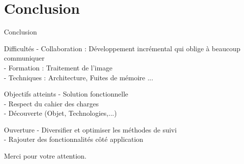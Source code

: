 \documentclass{beamer}
\begin{document}
	\section{Conclusion}
		\begin{frame}{Conclusion}
			\begin{alertblock}{Difficultés}
				- Collaboration : Développement incrémental qui oblige à beaucoup communiquer \\
				- Formation : Traitement de l'image \\
				- Techniques : Architecture, Fuites de mémoire ...\\
			\end{alertblock}
			\pause
			\begin{exampleblock}{Objectifs atteints}
				- Solution fonctionnelle \\
				- Respect du cahier des charges \\
				- Découverte (Objet, Technologies,...) \\ 
			\end{exampleblock}
			\pause
			\begin{block}{Ouverture}
				- Diversifier et optimiser les méthodes de suivi\\
				- Rajouter des fonctionnalités côté application \\
			\end{block}
		\end{frame}
	
	\begin{frame}
		\begin{center}
			\huge{Merci pour votre attention.} \\
		\end{center}
	\end{frame}
\end{document}
